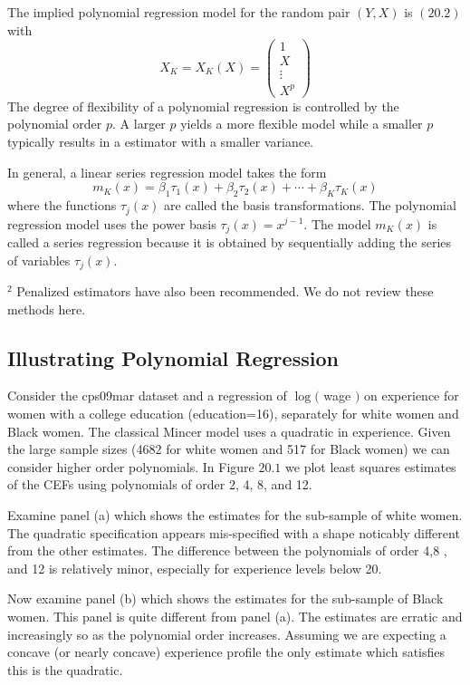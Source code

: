 \documentclass[10pt]{article}
\begin{document}
The implied polynomial regression model for the random pair $(Y, X)$ is $(20.2)$ with
$$
X_{K}=X_{K}(X)=\left(\begin{array}{c}
1 \\
X \\
\vdots \\
X^{p}
\end{array}\right)
$$
The degree of flexibility of a polynomial regression is controlled by the polynomial order $p$. A larger $p$ yields a more flexible model while a smaller $p$ typically results in a estimator with a smaller variance.

In general, a linear series regression model takes the form
$$
m_{K}(x)=\beta_{1} \tau_{1}(x)+\beta_{2} \tau_{2}(x)+\cdots+\beta_{K} \tau_{K}(x)
$$
where the functions $\tau_{j}(x)$ are called the basis transformations. The polynomial regression model uses the power basis $\tau_{j}(x)=x^{j-1}$. The model $m_{K}(x)$ is called a series regression because it is obtained by sequentially adding the series of variables $\tau_{j}(x)$.

${ }^{2}$ Penalized estimators have also been recommended. We do not review these methods here.

\subsection{Illustrating Polynomial Regression}
Consider the cps09mar dataset and a regression of $\log ($ wage $)$ on experience for women with a college education (education=16), separately for white women and Black women. The classical Mincer model uses a quadratic in experience. Given the large sample sizes (4682 for white women and 517 for Black women) we can consider higher order polynomials. In Figure $20.1$ we plot least squares estimates of the CEFs using polynomials of order 2, 4, 8, and 12.

Examine panel (a) which shows the estimates for the sub-sample of white women. The quadratic specification appears mis-specified with a shape noticably different from the other estimates. The difference between the polynomials of order 4,8 , and 12 is relatively minor, especially for experience levels below 20.

Now examine panel (b) which shows the estimates for the sub-sample of Black women. This panel is quite different from panel (a). The estimates are erratic and increasingly so as the polynomial order increases. Assuming we are expecting a concave (or nearly concave) experience profile the only estimate which satisfies this is the quadratic.
\end{document}
